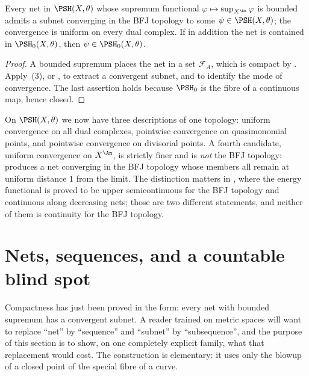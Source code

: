 \begin{corollary}
\label{cor:ch22-net-compactness}
Every net in \(\PSH(X,\theta)\) whose supremum functional
\(\varphi\mapsto\sup_{X^{\An}}\varphi\) is bounded admits a subnet
converging in the BFJ topology to some \(\psi\in\PSH(X,\theta)\); the
convergence is uniform on every dual complex.  If in addition the net is
contained in \(\PSH_0(X,\theta)\), then \(\psi\in\PSH_0(X,\theta)\).
\end{corollary}

\begin{proof}
A bounded supremum places the net in a set \(\mathcal F_A\), which is
compact by .  Apply
\,(3), or , to
extract a convergent subnet, and  to
identify the mode of convergence.  The last assertion holds because
\(\PSH_0\) is the fibre of a continuous map, hence closed.
\end{proof}

\begin{remark}
\label{rem:ch22-topology-comparison}
On \(\PSH(X,\theta)\) we now have three descriptions of one topology:
uniform convergence on all dual complexes, pointwise convergence on
quasimonomial points, and pointwise convergence on divisorial points.  A
fourth candidate, uniform convergence on \(X^{\An}\), is strictly finer and
is \emph{not} the BFJ topology:  produces
a net converging in the BFJ topology whose members all remain at uniform
distance \(1\) from the limit.  The distinction matters in
, where the energy functional is proved to be upper
semicontinuous for the BFJ topology and continuous along decreasing nets;
those are two different statements, and neither of them is continuity for
the BFJ topology.
\end{remark}

\section{Nets, sequences, and a countable blind spot}
\label{sec:ch22-nets}

Compactness has just been proved in the form: every net with bounded
supremum has a convergent subnet.  A reader trained on metric spaces will
want to replace ``net'' by ``sequence'' and ``subnet'' by ``subsequence'',
and the purpose of this section is to show, on one completely explicit
family, what that replacement would cost.  The construction is elementary:
it uses only the blowup of a closed point of the special fibre of a curve.

